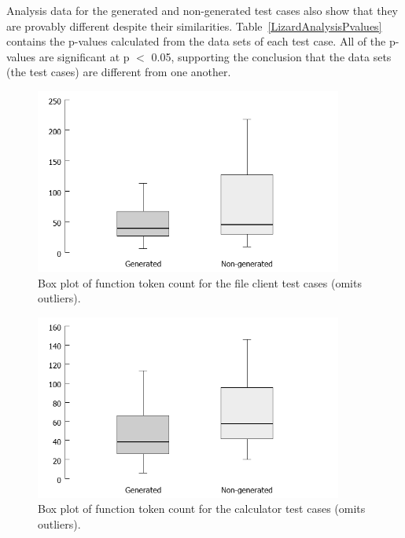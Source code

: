 \indent
Analysis data for the generated and non-generated test cases also show that they are provably different despite their similarities.  Table~\ref{LizardAnalysisPvalues} contains the p-values calculated from the data sets of each test case.  All of the p-values are significant at p $<$ 0.05, supporting the conclusion that the data sets (the test cases) are different from one another.

\begin{figure}[h!]
\centering
\includegraphics[width=0.9\textwidth]{figures/Lizard_FileClient_TokenCount.png}
\caption[Box plot of function token count for the file client test cases.]{Box plot of function token count for the file client test cases (omits outliers).}
\label{fig:Lizard_FileClient_TokenCount}
\end{figure}

\begin{figure}[h!]
\centering
\includegraphics[width=0.9\textwidth]{figures/Lizard_Calculator_TokenCount.png}
\caption[Box plot of function token count for the calculator test cases.]{Box plot of function token count for the calculator test cases (omits outliers).}
\label{fig:Lizard_Calculator_TokenCount}
\end{figure}

